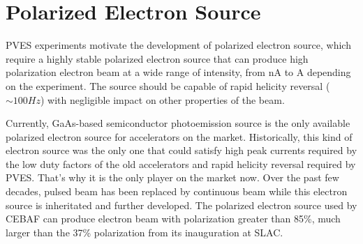 \section{Polarized Electron Source}
PVES experiments motivate the development of polarized electron source, which 
require a highly stable polarized electron source that can produce
high polarization electron beam at a wide range of intensity, from nA to A 
depending on the experiment. The source should be capable of rapid helicity
reversal ($\sim 100 Hz$) with negligible impact on other properties of the beam.

Currently, GaAs-based semiconductor photoemission source is %
the only available polarized electron source for accelerators on the market.
Historically, this 
kind of electron source was the only one that could satisfy high peak currents 
required by the low duty factors of the old accelerators and rapid helicity 
reversal required by PVES. That's why it is the only player on the market now.
Over the past few decades, pulsed beam has been replaced by continuous beam while
this electron source is inheritated and further developed. The polarized electron
source used by CEBAF can produce electron beam with polarization greater than
85\%, much larger than the 37\% polarization from its inauguration at SLAC. \cite{PRESCOTT1978347}

